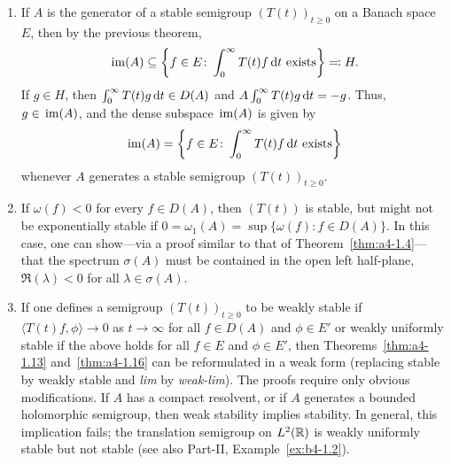 \begin{remark}\label{rem:a4-1.17}
\begin{enumerate}[\upshape (i), wide, labelindent=.25em]
\item 
If\/ $A$ is the generator of a stable semigroup
$(T(t))_{t \geq 0}$ on a Banach space $E$, then by the previous theorem,
\[{
\mathop{}\mathrm{im}(A) \subseteq \left\{f \in E\colon\int_{0}^{\infty} T(t)f  \mathop{}\!\mathrm{d}{t} 
\text{ exists} \right\}  \eqqcolon  H .
}
\]
If\/ $g \in H$, then $\int_{0}^{\infty} T(t)g  \mathop{}\!\mathrm{d}{t} \in D(A)$ and $A \int_{0}^{\infty} T(t)g  \mathop{}\!\mathrm{d}{t} = -g$. 
Thus, $g \in \mathop{}\mathrm{im}(A)$, and  the dense subspace $\mathop{}\mathrm{im}(A)$ is given
by
\begin{equation}\label{eq:a4-1.14}
\mathop{}\mathrm{im}(A) = \left\{f \in E\colon\int_{0}^{\infty} T(t)f  \mathop{}\!\mathrm{d}{t} \text{ exists} \right\}
\end{equation}
whenever $A$ generates a stable semigroup $(T(t))_{t \geq 0}$.

\item 
If\/ $\omega(f) < 0$ for every $f \in D(A)$, then $(T(t))$ is stable, but
might not be exponentially stable if
$0 = \omega_{1}(A) = \sup\{\omega(f) \colon f \in D(A)\}$.
In this case, one can show---via a
proof similar to that of Theorem~\ref{thm:a4-1.4}---that the spectrum $\sigma(A)$ must be contained
in the open left half-plane, \ie $\Re(\lambda) < 0$ for all $\lambda \in \sigma(A)$.

\item 
If one defines a semigroup $(T(t))_{t \geq 0}$ to be weakly stable if
$\langle T(t)f,\phi \rangle \to 0$ as $t \to \infty$ for all $f \in D(A)$ and $\phi \in E'$ or
weakly uniformly stable if the above holds  for all $f \in E$
and $\phi \in E'$, then Theorems~\ref{thm:a4-1.13} and~\ref{thm:a4-1.16} can be reformulated in a weak form (\ie  replacing stable by weakly stable and \emph{lim} by
\emph{weak-lim}). 
The proofs require only obvious modifications.
If $A$ has a compact resolvent, or if $A$ generates a bounded
holomorphic semigroup, then weak stability implies stability. 
In general, this implication fails; \eg the translation semigroup on
$L^{2}(\mathbb{R})$ is weakly uniformly stable but not stable (see also Part-II, Example~\ref{ex:b4-1.2}).
\end{enumerate}
\end{remark}
